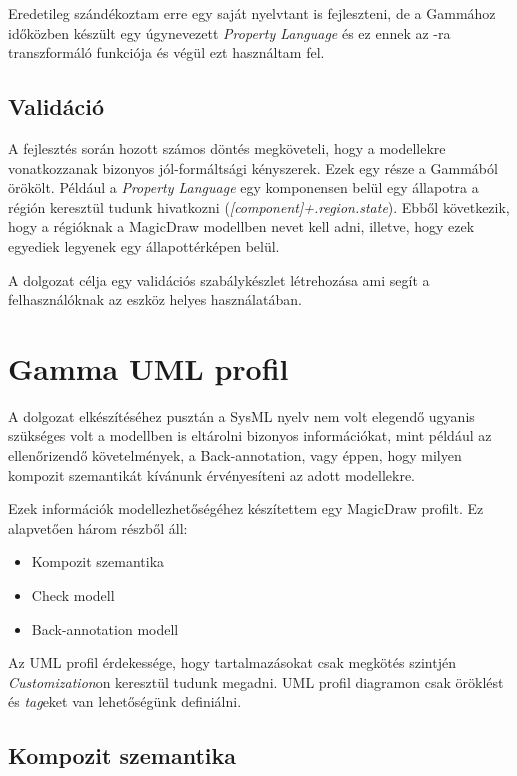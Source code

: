 Eredetileg szándékoztam erre egy saját nyelvtant is fejleszteni, de a Gammához időközben készült egy úgynevezett \emph{Property Language} és ez ennek az \uppaal-ra transzformáló funkciója és végül ezt használtam fel.

\subsection{Validáció}

A fejlesztés során hozott számos döntés megköveteli, hogy a modellekre vonatkozzanak bizonyos jól-formáltsági kényszerek. Ezek egy része a Gammából örökölt. Például a \emph{Property Language} egy komponensen belül egy állapotra a régión keresztül tudunk hivatkozni (\emph{[component]+.region.state}). Ebből következik, hogy a régióknak a MagicDraw modellben nevet kell adni, illetve, hogy ezek egyediek legyenek egy állapottérképen belül.

A dolgozat célja egy validációs szabálykészlet létrehozása ami segít a felhasználóknak az eszköz helyes használatában.

\newpage

\section{Gamma UML profil}

A dolgozat elkészítéséhez pusztán a SysML nyelv nem volt elegendő ugyanis szükséges volt  a modellben is eltárolni  bizonyos információkat, mint például az ellenőrizendő követelmények, a Back-annotation, vagy éppen, hogy milyen kompozit szemantikát kívánunk érvényesíteni az adott modellekre.

Ezek információk modellezhetőségéhez készítettem egy MagicDraw profilt. Ez alapvetően három részből áll:

\begin{itemize}
	\item Kompozit szemantika
	\item Check modell
	\item Back-annotation modell
\end{itemize}

Az UML profil érdekessége, hogy tartalmazásokat csak megkötés szintjén \emph{Customization}on keresztül tudunk megadni. UML profil diagramon csak öröklést és \emph{tag}eket van lehetőségünk definiálni.



\subsection{Kompozit szemantika}

